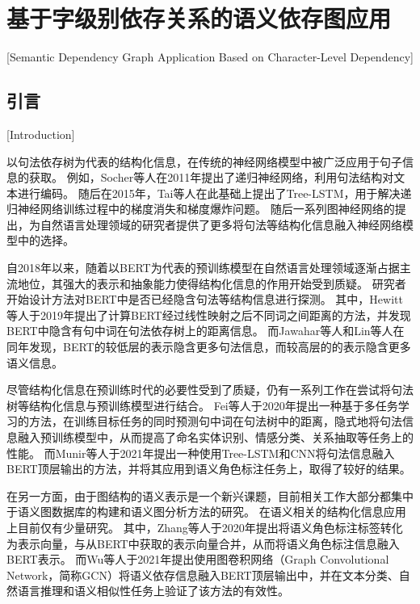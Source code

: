 
\chapter[基于字级别依存关系的语义依存图应用]{基于字级别依存关系的语义依存图应用}[Semantic Dependency Graph Application Based on Character-Level Dependency]

\section{引言}[Introduction]
\label{sec:chapter5-intro}

以句法依存树为代表的结构化信息，在传统的神经网络模型中被广泛应用于句子信息的获取。
例如，Socher等人\cite{socher-etal-2011-parsing}在2011年提出了递归神经网络，利用句法结构对文本进行编码。
随后在2015年，Tai等人在此基础上提出了Tree-LSTM，用于解决递归神经网络训练过程中的梯度消失和梯度爆炸问题。
随后一系列图神经网络\cite{kipf-welling-2017-semi, velickovic-etal-2018-gat}的提出，为自然语言处理领域的研究者提供了更多将句法等结构化信息融入神经网络模型中的选择。


自2018年以来，随着以BERT为代表的预训练模型在自然语言处理领域逐渐占据主流地位，其强大的表示和抽象能力使得结构化信息的作用开始受到质疑。
研究者开始设计方法对BERT中是否已经隐含句法等结构信息进行探测。
其中，Hewitt等人\cite{hewitt-manning-2019-structural}于2019年提出了计算BERT经过线性映射之后不同词之间距离的方法，并发现BERT中隐含有句中词在句法依存树上的距离信息。
而Jawahar等人\cite{jawahar-etal-2019-bert}和Lin等人\cite{lin-etal-2019-open}在同年发现，BERT的较低层的表示隐含更多句法信息，而较高层的的表示隐含更多语义信息。

尽管结构化信息在预训练时代的必要性受到了质疑，仍有一系列工作在尝试将句法树等结构化信息与预训练模型进行结合。
Fei等人\cite{fei-etal-2020-retrofitting}于2020年提出一种基于多任务学习的方法，在训练目标任务的同时预测句中词在句法树中的距离，隐式地将句法信息融入预训练模型中，从而提高了命名实体识别、情感分类、关系抽取等任务上的性能。
而Munir等人\cite{munir-etal-2021-adaptive}于2021年提出一种使用Tree-LSTM和CNN将句法信息融入BERT顶层输出的方法，并将其应用到语义角色标注任务上，取得了较好的结果。

在另一方面，由于图结构的语义表示是一个新兴课题，目前相关工作大部分都集中于语义图数据库的构建\cite{banarescu-etal-2013-abstract,abend-rappoport-2013-universal,oepen-etal-2015-semeval,che-etal-2016-semeval}和语义图分析方法的研究\cite{hershcovich-etal-2017-transition,dozat-manning-2018-simpler,cai-lam-2020-amr}。
在语义相关的结构化信息应用上目前仅有少量研究。
其中，Zhang等人\cite{zhang-etal-2020-semantics}于2020年提出将语义角色标注标签转化为表示向量，与从BERT中获取的表示向量合并，从而将语义角色标注信息融入BERT表示。
而Wu等人\cite{wu-etal-2021-infusing}于2021年提出使用图卷积网络\cite{kipf-welling-2017-semi}（Graph Convolutional Network，简称GCN）将语义依存信息融入BERT顶层输出中，并在文本分类、自然语言推理和语义相似性任务上验证了该方法的有效性。

